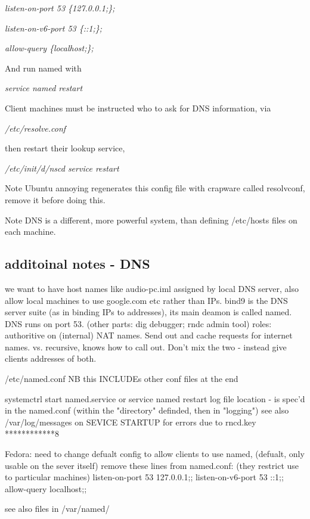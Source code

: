 \documentclass[oneside,english]{scrbook}
\begin{document}
\emph{listen-on-port 53 \{127.0.0.1;\}; }

\emph{listen-on-v6-port 53 \{::1;\}; }

\emph{allow-query \{localhost;\};}

And run named with

\emph{service named restart}

Client machines must be instructed who to ask for DNS information,
via 

\emph{/etc/resolve.conf}

then restart their lookup service,

\emph{/etc/init/d/nscd service restart}

Note Ubuntu annoying regenerates this config file with crapware called
resolvconf, remove it before doing this.

Note DNS is a different, more powerful system, than defining /etc/hosts
files on each machine.


\subsection{additoinal notes - DNS}
    we want to have host names like audio-pc.iml assigned by local DNS server, also allow local machines to use google.com etc rather than IPs.
    bind9 is the DNS server suite (as in binding IPs to addresses), its main deamon is called named.  DNS runs on port 53.
        (other parts: dig debugger; rndc admin tool)
    roles: authoritive on (internal) NAT names.   Send out and cache requests for internet names.
        vs. recursive, knows how to call out.   Don't mix the two - instead give clients addresses of both.

    /etc/named.conf
        NB this INCLUDEs other conf files at the end

    systemctrl start named.service      or  service named restart
    log file location - is spec'd in the named.conf (within the "directory" definded, then in "logging")
    see also /var/log/messages on SEVICE STARTUP for errors due to rncd.key ************8

    Fedora: need to change defualt config to allow clients to use named, (defualt, only usable on the sever itself)
        remove these lines from named.conf:  (they restrict use to particular machines)
            listen-on-port 53 {127.0.0.1;};
            listen-on-v6-port 53 {::1;};
            allow-query {localhost;};

    see also files in
        /var/named/
\end{document}
